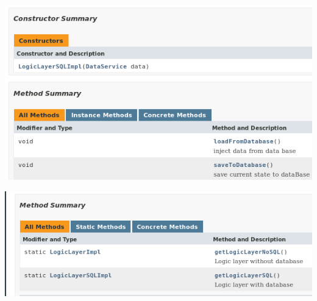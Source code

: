 \documentclass[a4paper,12pt]{article}
\begin{document}
\begin{minipage}{\textwidth}

    \includegraphics[width=\textwidth]{./screen/logicLayer/LogicLayerSQLImpl.png}
    \label{LogicLayerSQLImpl}

\end{minipage}

\begin{minipage}{\textwidth}

    \includegraphics[width=\textwidth]{./screen/logicLayer/LogicLayerFactory.png}
    \label{LogicLayerFactory}

\end{minipage}
\end{document}
